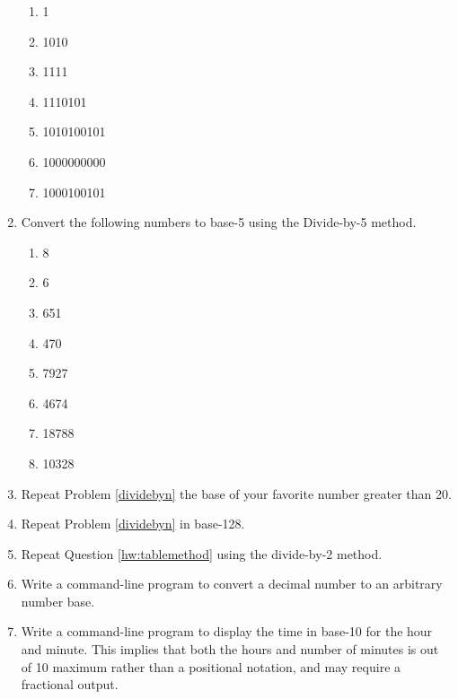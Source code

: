 \begin{multicols*}{2}
\begin{enumerate}[label=\thechapter.\arabic*]
\begin{enumerate}
        \item 1
        \item 1010
        \item 1111
        \item 1110101
        \item 1010100101
        \item 1000000000
        \item 1000100101
    \end{enumerate}
    \item \label{dividebyn} Convert the following numbers to base-5 using the Divide-by-5 method.
    \begin{multicols*}{2}
        \begin{enumerate}
            \item 8
            \item 6
            \item 651
            \item 470
            \item 7927
            \item 4674
            \item 18788
            \item 10328
        \end{enumerate}
    \end{multicols*}
    \item Repeat Problem \ref{dividebyn} the base of your favorite number greater than 20.
    \item Repeat Problem \ref{dividebyn} in base-128.
    \item Repeat Question \ref{hw:tablemethod} using the divide-by-2 method.
    \item Write a command-line program to convert a decimal number to an arbitrary number base.
    \item Write a command-line program to display the time in \gls{base-10} for the hour and minute. This implies that both the hours and number of minutes is out of 10 maximum rather 
    than a positional notation, and may require a fractional output. 
   \end{enumerate} 
\end{multicols*}
